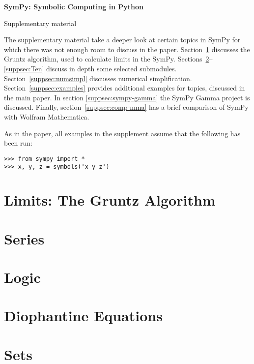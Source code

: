 \documentclass[fleqn,10pt,lineno,numbers]{wlpeerj} %
\begin{document}
\flushbottom
\thispagestyle{empty}%
\vskip-36pt%
{\raggedright\sffamily\bfseries\fontsize{20}{25}\selectfont SymPy: Symbolic Computing in Python\par}%
\vskip10pt
{\raggedright\sffamily\fontsize{12}{16}\selectfont  Supplementary material\par}
\vskip25pt%

The supplementary material take a deeper look at certain topics in SymPy for
which there was not enough room to discuss in the paper.
Section~\ref{suppsec:Gruntz} discusses the Gruntz algorithm, used to
calculate limits in the SymPy.  Sections~\ref{suppsec:Series}--\ref{suppsec:Ten}
discuss in depth some selected submodules.  Section~\ref{suppsec:numsimpl}
discusses numerical simplification.  Section~\ref{suppsec:examples} provides
additional examples for topics, discussed in the main paper.  In section
\ref{suppsec:sympy-gamma} the SymPy Gamma
project is discussed.  Finally, section~\ref{suppsec:comp-mma}
has a
brief comparison of SymPy with Wolfram Mathematica.

As in the paper, all examples in the supplement assume that the following
has been run:
\begin{verbatim}
>>> from sympy import *
>>> x, y, z = symbols('x y z')
\end{verbatim}


\section{Limits: The Gruntz Algorithm}
\label{suppsec:Gruntz}


\section{Series}
\label{suppsec:Series}


\section{Logic}
\label{suppsec:Logic}


\section{Diophantine Equations}
\label{suppsec:Dioph}


\section{Sets}
\label{suppsec:Sets}

\end{document}
